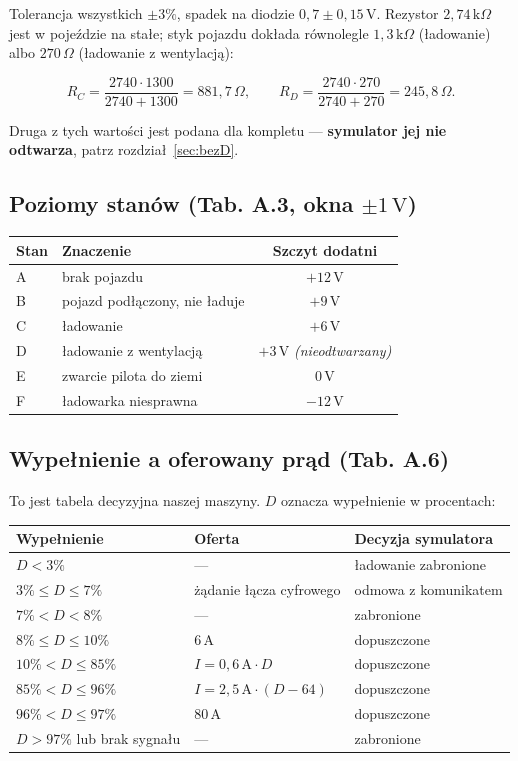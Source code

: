 \documentclass[a4paper,11pt]{article}
\newcommand{\ohm}{\,\Omega}
\newcommand{\kohm}{\,\mathrm{k}\Omega}
\newcommand{\volt}{\,\mathrm{V}}
\newcommand{\amp}{\,\mathrm{A}}
\begin{document}
Tolerancja wszystkich $\pm 3\%$, spadek na diodzie $0{,}7 \pm 0{,}15\volt$.
Rezystor $2{,}74\kohm$ jest w pojeździe na stałe; styk pojazdu dokłada równolegle
$1{,}3\kohm$ (ładowanie) albo $270\ohm$ (ładowanie z wentylacją):

\[
R_{C}=\frac{2740\cdot 1300}{2740+1300}=881{,}7\ohm,
\qquad
R_{D}=\frac{2740\cdot 270}{2740+270}=245{,}8\ohm .
\]

Druga z tych wartości jest podana dla kompletu --- \textbf{symulator jej nie odtwarza},
patrz rozdział~\ref{sec:bezD}.

\subsection{Poziomy stanów (Tab. A.3, okna \texorpdfstring{$\pm 1\volt$}{+/-1 V})}

\begin{center}
\begin{tabular}{llc}
\toprule
Stan & Znaczenie & Szczyt dodatni \\
\midrule
A & brak pojazdu & $+12\volt$ \\
B & pojazd podłączony, nie ładuje & $+9\volt$ \\
C & ładowanie & $+6\volt$ \\
D & ładowanie z wentylacją & $+3\volt$ \quad \emph{(nieodtwarzany)} \\
E & zwarcie pilota do ziemi & $0\volt$ \\
F & ładowarka niesprawna & $-12\volt$ \\
\bottomrule
\end{tabular}
\end{center}

\subsection{Wypełnienie a oferowany prąd (Tab. A.6)}

To jest tabela decyzyjna naszej maszyny. $D$ oznacza wypełnienie w procentach:

\begin{center}
\begin{tabular}{lll}
\toprule
Wypełnienie & Oferta & Decyzja symulatora \\
\midrule
$D<3\%$              & ---                       & ładowanie zabronione \\
$3\% \le D \le 7\%$  & żądanie łącza cyfrowego   & odmowa z komunikatem \\
$7\% < D < 8\%$      & ---                       & zabronione \\
$8\% \le D \le 10\%$ & $6\amp$                   & dopuszczone \\
$10\% < D \le 85\%$  & $I = 0{,}6\amp \cdot D$   & dopuszczone \\
$85\% < D \le 96\%$  & $I = 2{,}5\amp \cdot (D-64)$ & dopuszczone \\
$96\% < D \le 97\%$  & $80\amp$                  & dopuszczone \\
$D>97\%$ lub brak sygnału & ---                  & zabronione \\
\bottomrule
\end{tabular}
\end{center}
\end{document}
